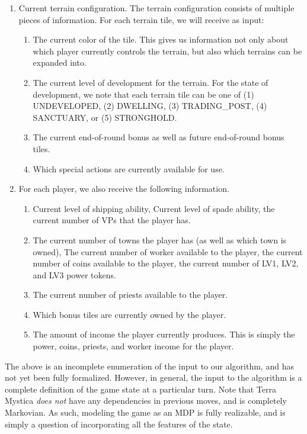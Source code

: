 \documentclass[10pt,twocolumn,letterpaper]{article}
\begin{document}
\begin{enumerate}
    \item Current terrain configuration. The terrain configuration consists of multiple pieces of information. For each terrain tile, we will receive as input:
    \begin{enumerate}
        \item The current color of the tile. This gives us information not only about which player currently controls the terrain, but also which terrains can be expanded into.
        \item The current level of development for the terrain. For the state of development, we note that each terrain tile can be one of (1) UNDEVELOPED, (2) DWELLING, (3) TRADING\_POST, (4) SANCTUARY, or (5) STRONGHOLD.
        \item The current end-of-round bonus as well as future end-of-round bonus tiles.
        \item Which special actions are currently available for use.
    \end{enumerate}
    \item For each player, we also receive the following information.
    \begin{enumerate}
        \item Current level of shipping ability, Current level of spade ability, the current number of VPs that the player has.
        \item The current number of towns the player has (as well as which town is owned), The current number of worker available to the player, the current number of coins available to the player, the current number of LV1, LV2, and LV3 power tokens.
        \item The current number of priests available to the player.
        \item Which bonus tiles are currently owned by the player.
        \item The amount of income the player currently produces. This is simply the power, coins, priests, and worker income for the player.
    \end{enumerate}
\end{enumerate}

The above is an incomplete enumeration of the input to our algorithm, and has not yet been fully formalized. However, in general, the input to the algorithm is a complete definition of the game state at a particular turn. Note that Terra Mystica \textit{does not} have any dependencies in previous moves, and is completely Markovian. As such, modeling the game as an MDP is fully realizable, and is simply a question of incorporating all the features of the state.
\end{document}
